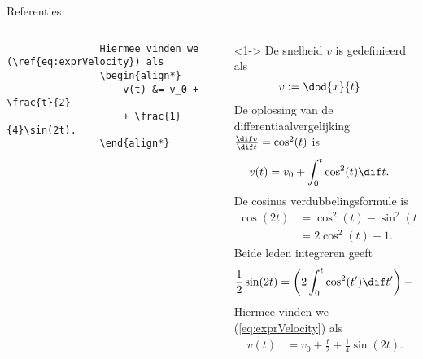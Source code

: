 \begin{frame}[fragile,t]{Referenties}
\begin{columns}[t]
\begin{column}{0.5\textwidth}
\begin{verbatim}
                Hiermee vinden we (\ref{eq:exprVelocity}) als
                \begin{align*}
                    v(t) &= v_0 + \frac{t}{2}
                    + \frac{1}{4}\sin(2t).
                \end{align*}
            \end{verbatim}
        \end{column}
        \begin{column}{0.5\textwidth}
            \begin{adjustbox}{frame=1pt 10pt,valign=t}%
                \begin{minipage}{\textwidth-22pt}
                    \begin{onlyenv}<1->%
                        {\tiny\setlength{\abovedisplayskip}{3pt}%
                            \setlength{\belowdisplayskip}{3pt}%
                            \setlength{\abovedisplayshortskip}{0pt}%
                            \setlength{\belowdisplayshortskip}{0pt}%
                            \setcounter{equation}{0}%
                            De snelheid $ v $ is gedefinieerd als
                            \begin{align}
                                v &:= \dod{x}{t}
                            \end{align}
                            De oplossing van de differentiaalvergelijking $ \frac{\dif v}{\dif t} = \cos^2(t) $ is
                            \begin{align}
                                v(t) & = v_0 + \int_{0}^{t}\cos^2(t)\dif t.
                                \label{eq:exprVelocity}
                            \end{align}
                            De cosinus verdubbelingsformule is
                            \begin{align*}
                                \cos(2t) & = \cos^2(t) - \sin^2(t) \\
                                         & = 2\cos^2(t)-1.
                            \end{align*}
                            Beide leden integreren geeft
                            \begin{align*}
                                \frac{1}{2}\sin(2t) & = \left(2\int_0^t\cos^2(t')\dif t'\right) - t.
                            \end{align*}
                            Hiermee vinden we (\ref{eq:exprVelocity}) als
                            \begin{align*}
                                v(t) & = v_0 + \frac{t}{2} + \frac{1}{4}\sin(2t).
                            \end{align*}
                        }%
                    \end{onlyenv}%
                \end{minipage}
            \end{adjustbox}
        \end{column}
    \end{columns}
\end{frame}
